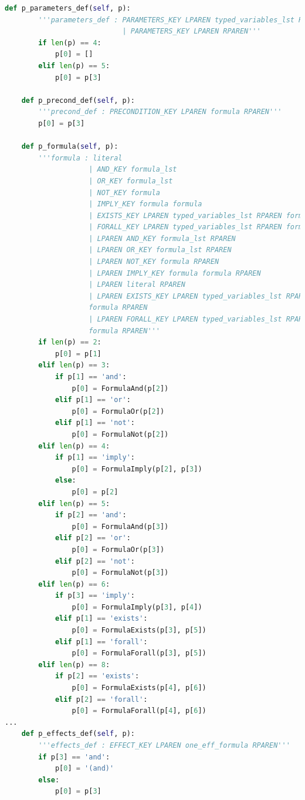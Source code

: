 \begin{lstlisting}[language=Python, style=Python, escapechar = £,  label={code:fond-parser}, caption={The \texttt{MyParser} class.}]
    def p_parameters_def(self, p):
        '''parameters_def : PARAMETERS_KEY LPAREN typed_variables_lst RPAREN
                            | PARAMETERS_KEY LPAREN RPAREN'''
        if len(p) == 4:
            p[0] = []
        elif len(p) == 5:
            p[0] = p[3]

    def p_precond_def(self, p):
        '''precond_def : PRECONDITION_KEY LPAREN formula RPAREN'''
        p[0] = p[3]

    def p_formula(self, p):
        '''formula : literal
                    | AND_KEY formula_lst
                    | OR_KEY formula_lst
                    | NOT_KEY formula
                    | IMPLY_KEY formula formula
                    | EXISTS_KEY LPAREN typed_variables_lst RPAREN formula
                    | FORALL_KEY LPAREN typed_variables_lst RPAREN formula
                    | LPAREN AND_KEY formula_lst RPAREN
                    | LPAREN OR_KEY formula_lst RPAREN
                    | LPAREN NOT_KEY formula RPAREN
                    | LPAREN IMPLY_KEY formula formula RPAREN
                    | LPAREN literal RPAREN
                    | LPAREN EXISTS_KEY LPAREN typed_variables_lst RPAREN 
                    formula RPAREN
                    | LPAREN FORALL_KEY LPAREN typed_variables_lst RPAREN 
                    formula RPAREN'''
        if len(p) == 2:
            p[0] = p[1]
        elif len(p) == 3:
            if p[1] == 'and':
                p[0] = FormulaAnd(p[2])
            elif p[1] == 'or':
                p[0] = FormulaOr(p[2])
            elif p[1] == 'not':
                p[0] = FormulaNot(p[2])
        elif len(p) == 4:
            if p[1] == 'imply':
                p[0] = FormulaImply(p[2], p[3])
            else:
                p[0] = p[2]
        elif len(p) == 5:
            if p[2] == 'and':
                p[0] = FormulaAnd(p[3])
            elif p[2] == 'or':
                p[0] = FormulaOr(p[3])
            elif p[2] == 'not':
                p[0] = FormulaNot(p[3])
        elif len(p) == 6:
            if p[3] == 'imply':
                p[0] = FormulaImply(p[3], p[4])
            elif p[1] == 'exists':
                p[0] = FormulaExists(p[3], p[5])
            elif p[1] == 'forall':
                p[0] = FormulaForall(p[3], p[5])
        elif len(p) == 8:
            if p[2] == 'exists':
                p[0] = FormulaExists(p[4], p[6])
            elif p[2] == 'forall':
                p[0] = FormulaForall(p[4], p[6])
...
    def p_effects_def(self, p):
        '''effects_def : EFFECT_KEY LPAREN one_eff_formula RPAREN'''
        if p[3] == 'and':
            p[0] = '(and)'
        else:
            p[0] = p[3]


\end{lstlisting}
